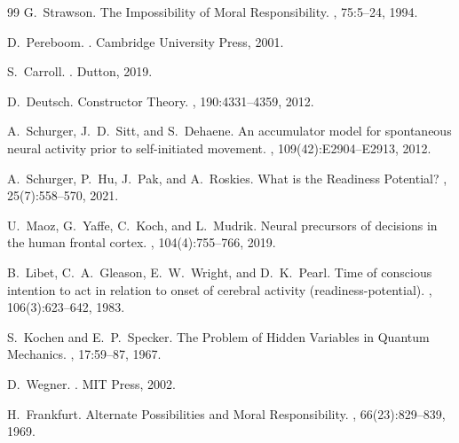 \documentclass[12pt,a4paper]{article}
\theoremstyle{definition}
\theoremstyle{remark}
\begin{document}
\begin{thebibliography}{99}
G.~Strawson.
\newblock The Impossibility of Moral Responsibility.
, 75:5--24, 1994.

D.~Pereboom.
.
\newblock Cambridge University Press, 2001.

S.~Carroll.
.
\newblock Dutton, 2019.

D.~Deutsch.
\newblock Constructor Theory.
, 190:4331--4359, 2012.

A.~Schurger, J.~D.~Sitt, and S.~Dehaene.
\newblock An accumulator model for spontaneous neural activity prior to
  self-initiated movement.
,
  109(42):E2904--E2913, 2012.

A.~Schurger, P.~Hu, J.~Pak, and A.~Roskies.
\newblock What is the Readiness Potential?
, 25(7):558--570, 2021.

U.~Maoz, G.~Yaffe, C.~Koch, and L.~Mudrik.
\newblock Neural precursors of decisions in the human frontal cortex.
, 104(4):755--766, 2019.

B.~Libet, C.~A.~Gleason, E.~W.~Wright, and D.~K.~Pearl.
\newblock Time of conscious intention to act in relation to onset of cerebral
  activity (readiness-potential).
, 106(3):623--642, 1983.

S.~Kochen and E.~P.~Specker.
\newblock The Problem of Hidden Variables in Quantum Mechanics.
, 17:59--87, 1967.

D.~Wegner.
.
\newblock MIT Press, 2002.

H.~Frankfurt.
\newblock Alternate Possibilities and Moral Responsibility.
, 66(23):829--839, 1969.

\end{thebibliography}
\end{document}
